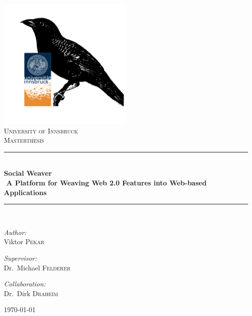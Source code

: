 \documentclass[]{article}
\newcommand{\HRule}{\rule{\linewidth}{0.5mm}}
\begin{document}
\begin{titlepage}
\begin{center}


\includegraphics[width=0.5\textwidth]{images/sowebird+uibk.png}~\\[1cm]

\textsc{\LARGE University of Innsbruck}\\[1.5cm]

\textsc{\Large Masterthesis}\\[0.5cm]

\HRule\\[0.4cm]
{ \huge \bfseries Social Weaver\\[0.2cm] \large A Platform for Weaving Web 2.0 Features into Web-based Applications}\\[0.4cm]

\HRule \\[1.5cm]

\begin{minipage}{0.4\textwidth}
\begin{flushleft} \large
\emph{Author:}\\
Viktor \textsc{Pekar}
\end{flushleft}
\end{minipage}
\begin{minipage}{0.4\textwidth}
\begin{flushright} \large
\emph{Supervisor:} \\
Dr.~Michael \textsc{Felderer}
\end{flushright}
\begin{flushright} \large
\emph{Collaboration:} \\
Dr.~Dirk \textsc{Draheim}
\end{flushright}

\end{minipage}

\vfill

{\large \today}

\end{center}
\end{titlepage}
\newpage
\end{document}

